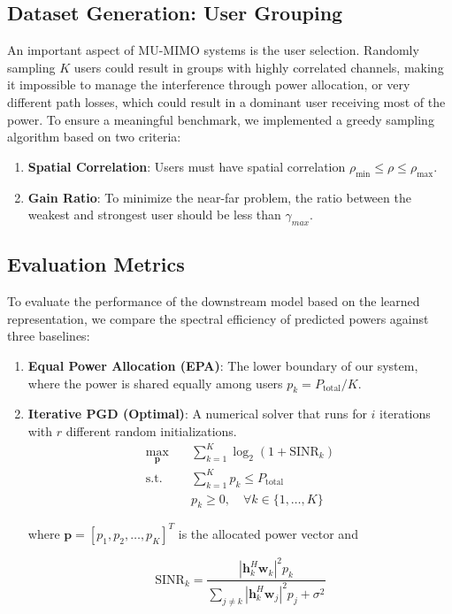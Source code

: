 \subsection{Dataset Generation: User Grouping}\label{sec:task_power_dataset}

An important aspect of MU-MIMO systems is the user selection. Randomly sampling $K$ users could result in groups with highly correlated channels, making it impossible to manage the interference through power allocation, or very different path losses, which could result in a dominant user receiving most of the power.
To ensure a meaningful benchmark, we implemented a greedy sampling algorithm based on two criteria:

\begin{enumerate}
    \item \textbf{Spatial Correlation}: Users must have spatial correlation $\rho_{\text{min}} \leq \rho \leq \rho_{\text{max}}$.
    \item \textbf{Gain Ratio}: To minimize the near-far problem, the ratio between the weakest and strongest user should be less than $\gamma_{max}$.
\end{enumerate}

\subsection{Evaluation Metrics}\label{sec:task_power_evaluation}

To evaluate the performance of the downstream model based on the learned representation, we compare the spectral efficiency of predicted powers against three baselines:

\begin{enumerate}
    \item \textbf{Equal Power Allocation (EPA)}: The lower boundary of our system, where the power is shared equally among users $p_k = P_{\text{total}} / K $.
    \item \textbf{Iterative PGD (Optimal)}: A numerical solver that runs for $i$ iterations with $r$ different random initializations.
    \begin{equation}
        \begin{aligned}
            \max_{\mathbf{p}} \quad & \sum_{k=1}^{K} \log_2(1 + \text{SINR}_k) \\
            \text{s.t.} \quad & \sum_{k=1}^{K} p_k \leq P_{\text{total}} \\
            & p_k \geq 0, \quad \forall k \in \{1, \dots, K\}
        \end{aligned}
        \label{eq:sum_rate_optimization}
    \end{equation}
    
    where $\mathbf{p} = [p_1, p_2, \dots, p_K]^T$ is the allocated power vector and

    \begin{equation}
        \text{SINR}_k = \frac{|\mathbf{h}_k^H \mathbf{w}_k|^2 p_k}{\sum_{j \ne k} |\mathbf{h}_k^H \mathbf{w}_j|^2 p_j + \sigma^2}
    \end{equation}
\end{enumerate}